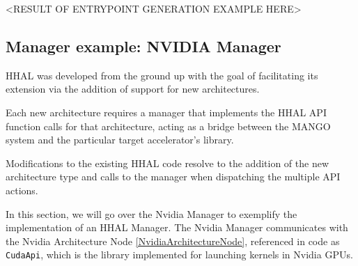 <RESULT OF ENTRYPOINT GENERATION EXAMPLE HERE>

\subsection{Manager example: NVIDIA Manager}

HHAL was developed from the ground up with the goal of facilitating its extension via the addition of support for new architectures.

Each new architecture requires a manager that implements the HHAL API function calls for that architecture, acting as a bridge between the MANGO system and the particular target accelerator's library.

Modifications to the existing HHAL code resolve to the addition of the new architecture type and calls to the manager when dispatching the multiple API actions.

In this section, we will go over the Nvidia Manager to exemplify the implementation of an HHAL Manager. The Nvidia Manager communicates with the Nvidia Architecture Node \ref{NvidiaArchitectureNode}, referenced in code as \texttt{CudaApi}, which is the library implemented for launching kernels in Nvidia GPUs.

